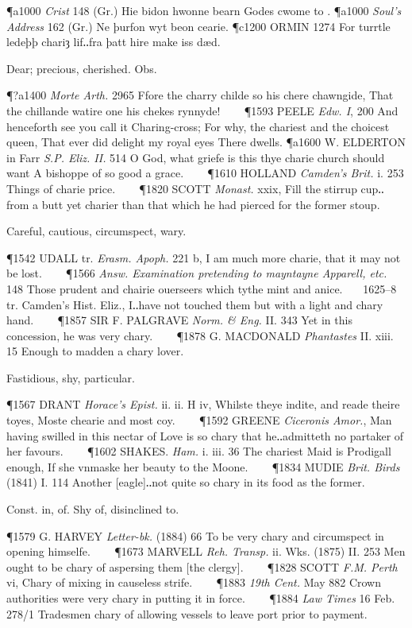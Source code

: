 \begin{description}[wide, labelwidth=!, labelindent=0pt]
\begin{myenumerate}
\P a1000 \textit{Crist}  148 (Gr.) Hie bidon hwonne bearn Godes cwome to .
\P a1000 \textit{Soul's  Address} 162 (Gr.) Ne þurfon wyt beon cearie.
\P c1200 ORMIN 1274 For  turrtle ledeþþ chariȝ lif‥fra þatt hire make iss dæd.

 Dear; precious, cherished. Obs.

\P ?a1400 \textit{Morte  Arth.} 2965 Ffore the charry childe so his chere chawngide, That the chillande watire one his chekes rynnyde!    
\P 1593 PEELE  \textit{Edw. I}, 200 And henceforth see you call it Charing-cross; For why, the chariest and the choicest queen, That ever did delight my royal eyes There dwells.
\P a1600 W. ELDERTON  in Farr \textit{S.P. Eliz. II.} 514 O God, what griefe is this thye charie church should want A bishoppe of so good a grace.    
\P 1610 HOLLAND  \textit{Camden's Brit.} i. 253 Things of charie price.    
\P 1820 SCOTT  \textit{Monast.} xxix, Fill the stirrup cup‥from a butt yet charier than that which he had pierced for the former stoup.

 Careful, cautious, circumspect, wary.

\P 1542 UDALL tr. \textit{Erasm. Apoph.} 221 b, I am much more charie, that it may not be lost.    
\P 1566  \textit{Answ. Examination pretending to mayntayne Apparell, etc.} 148 Those prudent and chairie ouerseers which tythe mint and anice.    1625–8 tr. Camden's Hist. Eliz., I‥have not touched them but with a light and chary hand.    
\P 1857 SIR F. PALGRAVE  \textit{Norm. \& Eng.} II. 343 Yet in this concession, he was very chary.    
\P 1878 G. MACDONALD  \textit{Phantastes} II. xiii. 15 Enough to madden a chary lover.

 Fastidious, shy, particular.

\P 1567 DRANT  \textit{Horace's Epist.} ii. ii. H iv, Whilste theye indite, and reade theire toyes, Moste chearie and most coy.    
\P 1592 GREENE  \textit{Ciceronis Amor.}, Man having swilled in this nectar of Love is so chary that he‥admitteth no partaker of her favours.    
\P 1602 SHAKES.  \textit{Ham.} i. iii. 36 The chariest Maid is Prodigall enough, If she vnmaske her beauty to the Moone.    
\P 1834 MUDIE  \textit{Brit. Birds} (1841) I. 114 Another [eagle]‥not quite so chary in its food as the former.

 Const. in, of. Shy of, disinclined to.

\P 1579 G. HARVEY  \textit{Letter-bk.} (1884) 66 To be very chary and circumspect in opening himselfe.    
\P 1673 MARVELL  \textit{Reh. Transp.} ii. Wks. (1875) II. 253 Men ought to be chary of aspersing them [the clergy].    
\P 1828 SCOTT  \textit{F.M. Perth} vi, Chary of mixing in causeless strife.    
\P 1883 \textit{19th  Cent.} May 882 Crown authorities were very chary in putting it in force.    
\P 1884 \textit{Law  Times} 16 Feb. 278/1 Tradesmen chary of allowing vessels to leave port prior to payment.


\end{myenumerate}
\end{description}
